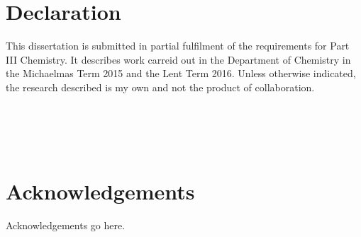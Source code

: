 \documentclass[a4paper,12pt,openright,oneside]{article}
\begin{document}
\cleardoublepage

\cleardoublepage
{}
\thispagestyle{empty}
\cleardoublepage
\section*{Declaration}

This dissertation is submitted in partial fulfilment of the requirements for Part III Chemistry. It describes work carreid out in the Department of Chemistry in the Michaelmas Term 2015 and the Lent Term 2016. Unless otherwise indicated, the research described is my own and not the product of collaboration.
\\
\\
\\
\\
\\
\section*{Acknowledgements}

Acknowledgements go here.

\newpage

\cleardoublepage

\newpage

\tableofcontents


\newpage
\cleardoublepage
{}
\fancyhead{}
\rhead{\thepage}
\lhead{\leftmark}
\lfoot[]{}
\rfoot[]{}
\cfoot[]{}
\pagestyle{fancy}
    
\newpage

\newpage

\newpage

\newpage

\newpage




\newpage
{}

\newpage
\cleardoublepage
\end{document}
